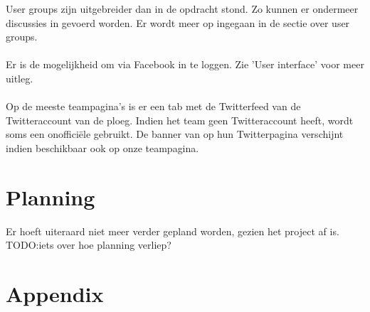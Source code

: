 \documentclass[11pt, a4paper]{article}
\begin{document}
User groups zijn uitgebreider dan in de opdracht stond. Zo kunnen er ondermeer discussies in gevoerd worden. Er wordt meer op ingegaan in de sectie over user groups. \\ \\
Er is de mogelijkheid om via Facebook in te loggen. Zie 'User interface' voor meer uitleg. \\ \\
Op de meeste teampagina's is er een tab met de Twitterfeed van de Twitteraccount van de ploeg. Indien het team geen Twitteraccount heeft, wordt soms een onoffici\"ele gebruikt. De banner van op hun Twitterpagina verschijnt indien beschikbaar ook op onze teampagina.
\section{Planning}
Er hoeft uiteraard niet meer verder gepland worden, gezien het project af is.
TODO:iets over hoe planning verliep?

\section{Appendix}
\end{document}
